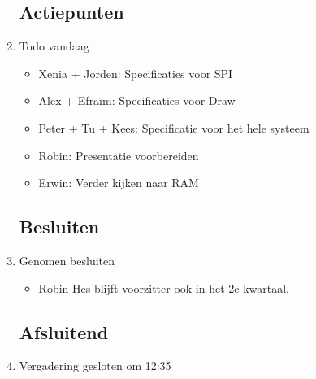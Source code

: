 \documentclass{article}
\begin{document}
\begin{enumerate}
	\subsection*{Actiepunten}
	\item Todo vandaag
	\begin{itemize}
		\item Xenia + Jorden: Specificaties voor SPI
		\item Alex + Efraïm: Specificaties voor Draw
		\item Peter + Tu + Kees: Specificatie voor het hele systeem
		\item Robin: Presentatie voorbereiden
		\item Erwin: Verder kijken naar RAM
	\end{itemize}

	\subsection*{Besluiten}
	\item Genomen besluiten
	\begin{itemize}
		\item Robin Hes blijft voorzitter ook in het 2e kwartaal.
	\end{itemize}

	\noindent 
	\subsection*{Afsluitend}
	\item Vergadering gesloten om 12:35 %

\end{enumerate}
\end{document}
